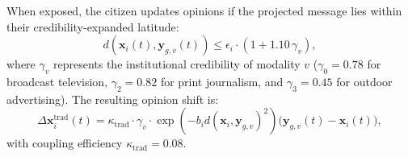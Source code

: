 \documentclass[11pt,a4paper]{article}
\begin{document}
When exposed, the citizen updates opinions if the projected message lies within their credibility-expanded latitude:
\begin{equation}
    d(\mathbf{x}_i(t), \mathbf{y}_{g,v}(t)) \le \epsilon_i \cdot (1 + 1.10\,\gamma_v),
    \label{eq:credibility_expanded_latitude}
\end{equation}
where $\gamma_v$ represents the institutional credibility of modality $v$ ($\gamma_0 = 0.78$ for broadcast television, $\gamma_2 = 0.82$ for print journalism, and $\gamma_3 = 0.45$ for outdoor advertising). The resulting opinion shift is:
\begin{equation}
    \Delta \mathbf{x}_i^{\mathrm{trad}}(t) = \kappa_{\mathrm{trad}} \cdot \gamma_v \cdot \exp\!\left(-b_i d(\mathbf{x}_i, \mathbf{y}_{g,v})^2\right) \big(\mathbf{y}_{g,v}(t) - \mathbf{x}_i(t)\big),
    \label{eq:traditional_opinion_shift}
\end{equation}
with coupling efficiency $\kappa_{\mathrm{trad}} = 0.08$.
\end{document}
